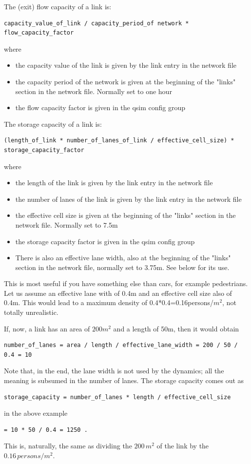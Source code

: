 The (exit) flow capacity of a link is:
\begin{lstlisting}
capacity_value_of_link / capacity_period_of network * flow_capacity_factor
\end{lstlisting}
where
\begin{itemize}
	\item the capacity value of the link is given by the link entry in the network file
	\item the  capacity period of the network is given at the beginning of the "links"  section in the network file. Normally set to one hour
	\item the flow capacity factor is given in the qsim config group
\end{itemize}

The storage capacity of a link is:
\begin{lstlisting}
(length_of_link * number_of_lanes_of_link / effective_cell_size) * storage_capacity_factor
\end{lstlisting}
where
\begin{itemize}
	\item the length of the link is given by the link entry in the network file
	\item the number of lanes of the link is given by the link entry in the network file
	\item the effective cell size is given at the beginning of the "links" section in the network file. Normally set to 7.5m
	\item the storage capacity factor is given in the qsim config group
	\item There  is also an effective lane width, also at the beginning of the "links"  section in the network file, normally set to 3.75m. See below for  its use.
\end{itemize}

This is most useful if you have something else than  cars, for example pedestrians. Let us assume an effective lane  with of 0.4m and an effective cell size also of 0.4m. This would  lead to a maximum density of 0.4*0.4=0.16persons/$m^2$, not totally  unrealistic.

If, now, a link has an area of $200m^2$ and a length of 50m, then it would obtain
\begin{lstlisting}
number_of_lanes = area / length / effective_lane_width = 200 / 50 / 0.4 = 10
\end{lstlisting}

Note that, in the end, the lane width is not used by the  dynamics; all the meaning is subsumed in the number of lanes. The  storage capacity comes out as
\begin{lstlisting}
storage_capacity = number_of_lanes * length / effective_cell_size
\end{lstlisting}
in the above example
\begin{lstlisting}
= 10 * 50 / 0.4 = 1250 .
\end{lstlisting}
This is, naturally, the same as dividing the $200\,m^2$ of the link by the $0.16\,persons/m^2$.


